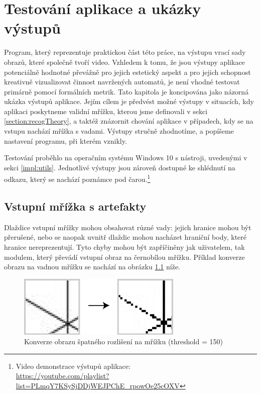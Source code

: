 \chapter{Testování aplikace a ukázky výstupů} 
\label{testing}

Program, který reprezentuje praktickou část této práce, na výstupu vrací sady obrazů, které společně tvoří video. Vzhledem k tomu, že jsou výstupy aplikace potenciálně hodnotné převážně pro jejich estetický aspekt a pro jejich schopnost kreativně vizualizovat činnost navržených automatů, je není vhodné testovat primárně pomocí formálních metrik. Tato kapitola je koncipována jako názorná ukázka výstupů aplikace. Jejím cílem je předvést možné výstupy v situacích, kdy aplikaci poskytneme validní mřížku, kterou jsme definovali v sekci \ref{section:recogTheory}, a taktéž znázornit chování aplikace v případech, kdy se na vstupu nachází mřížka s vadami. Výstupy stručně zhodnotíme, a popíšeme nastavení programu, při kterém vznikly. 

Testování proběhlo na operačním systému Windows 10 s nástroji, uvedenými v sekci \ref{impl:utils}. Jednotlivé výstupy jsou zároveň dostupné ke shlédnutí na odkazu, který se nachází poznámce pod čarou.\footnote{Video demonstrace výstupů aplikace: \\ \url{https://youtube.com/playlist?list=PLmqY7KSySjDDjWEJPChE_rpowOe25cOXV}}

\section{Vstupní mřížka s artefakty}

Dlaždice vstupní mřížky mohou obsahovat různé vady: jejich hranice mohou být přerušené, nebo se naopak uvnitř dlaždic mohou nacházet hraniční body, které hranice nereprezentují. Tyto chyby mohou být zapříčiněny jak uživatelem, tak modulem, který převádí vstupní obraz na černobílou mřížku. Příklad konverze obrazu na vadnou mřížku se nachází na obrázku \ref{fig:KonverzeSpatneMrizky} níže.

\begin{figure}[H]
    \centering
    \includegraphics[width=0.7\textwidth]{obrazky-figures/KonverzeSpatneMrizky.pdf}
    \caption{Konverze obrazu špatného rozlišení na mřížku (threshold = 150)}
    \label{fig:KonverzeSpatneMrizky}
\end{figure}

